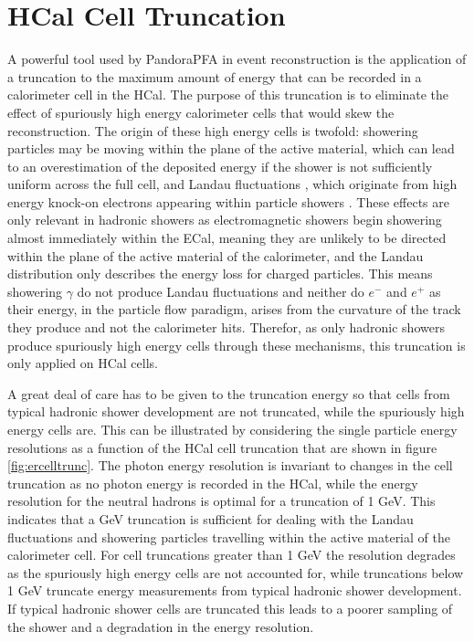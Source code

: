 
\section{HCal Cell Truncation}
\label{sec:hcalcelltruncation}
A powerful tool used by PandoraPFA in event reconstruction is the application of a truncation to the maximum amount of energy that can be recorded in a calorimeter cell in the HCal.  The purpose of this truncation is to eliminate the effect of spuriously high energy calorimeter cells that would skew the reconstruction.  The origin of these high energy cells is twofold: showering particles may be moving within the plane of the active material, which can lead to an overestimation of the deposited energy if the shower is not sufficiently uniform across the full cell, and Landau fluctuations \cite{Landau:1944if}, which originate from high energy knock-on electrons appearing within particle showers \cite{Bichsel:2004ej}.  These effects are only relevant in hadronic showers as electromagnetic showers begin showering almost immediately within the ECal, meaning they are unlikely to be directed within the plane of the active material of the calorimeter, and the Landau distribution only describes the energy loss for charged particles.  This means showering $\gamma$ do not produce Landau fluctuations and neither do $e^{-}$ and $e^{+}$ as their energy, in the particle flow paradigm, arises from the curvature of the track they produce and not the calorimeter hits.  Therefor, as only hadronic showers produce spuriously high energy cells through these mechanisms, this truncation is only applied on HCal cells.  

A great deal of care has to be given to the truncation energy so that cells from typical hadronic shower development are not truncated, while the spuriously high energy cells are.  This can be illustrated by considering the single particle energy resolutions as a function of the HCal cell truncation that are shown in figure \ref{fig:ercelltrunc}.  The photon energy resolution is invariant to changes in the cell truncation as no photon energy is recorded in the HCal, while the energy resolution for the neutral hadrons is optimal for a truncation of 1 GeV.  This indicates that a  GeV truncation is sufficient for dealing with the Landau fluctuations and showering particles travelling within the active material of the calorimeter cell.  For cell truncations greater than 1 GeV the resolution degrades as the spuriously high energy cells are not accounted for, while truncations below 1 GeV truncate energy measurements from typical hadronic shower development.  If typical hadronic shower cells are truncated this leads to a poorer sampling of the shower and a degradation in the energy resolution.  

